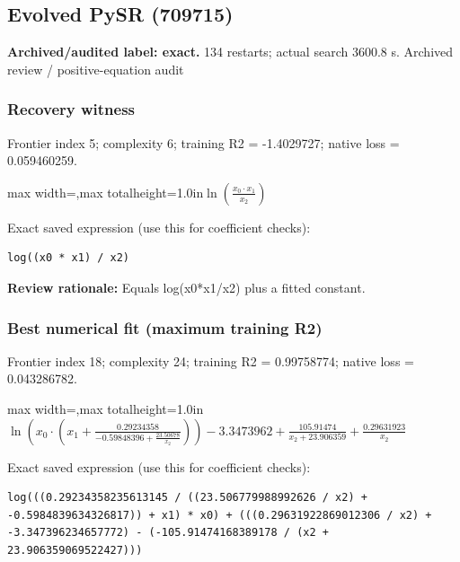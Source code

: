 \documentclass[10pt,letterpaper,landscape]{article}
\begin{document}
\begin{minipage}[t]{0.485\textwidth}
\subsection*{Evolved PySR (709715)}
\textbf{Archived/audited label: exact.} 134 restarts; actual search 3600.8 s.
{\small Archived review / positive-equation audit}
\subsubsection*{Recovery witness}
Frontier index 5; complexity 6; training R2 = -1.4029727; native loss = 0.059460259.
\begin{center}\begin{adjustbox}{max width=\linewidth,max totalheight=1.0in}$\displaystyle \ln{\left(\frac{x_{0} \cdot x_{1}}{x_{2}} \right)}$\end{adjustbox}\end{center}
{\scriptsize Exact saved expression (use this for coefficient checks):}
\begin{lstlisting}
log((x0 * x1) / x2)
\end{lstlisting}
{\small\textbf{Review rationale:} Equals log(x0*x1/x2) plus a fitted constant.}
\subsubsection*{Best numerical fit (maximum training R2)}
Frontier index 18; complexity 24; training R2 = 0.99758774; native loss = 0.043286782.
\begin{center}\begin{adjustbox}{max width=\linewidth,max totalheight=1.0in}$\displaystyle \ln{\left(x_{0} \cdot \left(x_{1} + \frac{0.29234358}{-0.59848396 + \frac{23.50678}{x_{2}}}\right) \right)} - 3.3473962 + \frac{105.91474}{x_{2} + 23.906359} + \frac{0.29631923}{x_{2}}$\end{adjustbox}\end{center}
{\scriptsize Exact saved expression (use this for coefficient checks):}
\begin{lstlisting}
log(((0.29234358235613145 / ((23.506779988992626 / x2) + -0.5984839634326817)) + x1) * x0) + (((0.29631922869012306 / x2) + -3.347396234657772) - (-105.91474168389178 / (x2 + 23.906359069522427)))
\end{lstlisting}
\end{minipage}
\clearpage{}\label{ideal_gas-10005}
\end{document}
